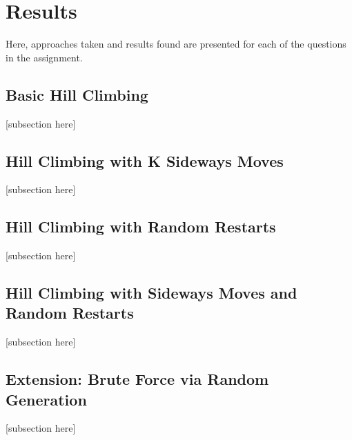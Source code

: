 \section{Results}
\label{section:results}
Here, approaches taken and results found are presented for each of the questions in the assignment.

\subsection{Basic Hill Climbing}
[subsection here]

\subsection{Hill Climbing with K Sideways Moves}
[subsection here]

\subsection{Hill Climbing with Random Restarts}
[subsection here]

\subsection{Hill Climbing with Sideways Moves and Random Restarts}
[subsection here]

\subsection{Extension: Brute Force via Random Generation}
[subsection here]
